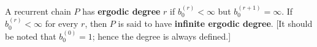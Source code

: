 A recurrent chain $P$ has \textbf{ergodic degree} $r$ if $b_0^{(r)} < \infty$ but $b_0^{(r+1)} = \infty$. If $b_0^{(r)} < \infty$ for every $r$, then $P$ is said to have \textbf{infinite ergodic degree}. [It should be noted that $b_0^{(0)} = 1$; hence the degree is always defined.]
